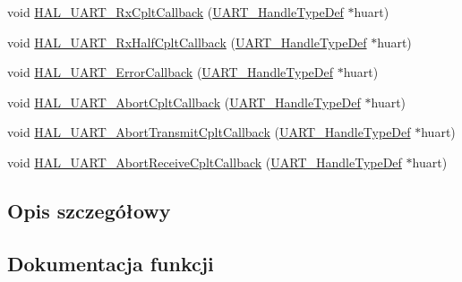\begin{DoxyCompactItemize}
\item 
void \hyperlink{group___u_a_r_t___exported___functions___group2_gae494a9643f29b87d6d81e5264e60e57b}{H\+A\+L\+\_\+\+U\+A\+R\+T\+\_\+\+Rx\+Cplt\+Callback} (\hyperlink{group___u_a_r_t___exported___types_ga7adf4f3e4c3ecde572be5925c915a967}{U\+A\+R\+T\+\_\+\+Handle\+Type\+Def} $\ast$huart)
\item 
void \hyperlink{group___u_a_r_t___exported___functions___group2_ga1884970cc493d8efba5aec28c0d526e7}{H\+A\+L\+\_\+\+U\+A\+R\+T\+\_\+\+Rx\+Half\+Cplt\+Callback} (\hyperlink{group___u_a_r_t___exported___types_ga7adf4f3e4c3ecde572be5925c915a967}{U\+A\+R\+T\+\_\+\+Handle\+Type\+Def} $\ast$huart)
\item 
void \hyperlink{group___u_a_r_t___exported___functions___group2_ga0e0456ea96d55db31de947fb3e954f18}{H\+A\+L\+\_\+\+U\+A\+R\+T\+\_\+\+Error\+Callback} (\hyperlink{group___u_a_r_t___exported___types_ga7adf4f3e4c3ecde572be5925c915a967}{U\+A\+R\+T\+\_\+\+Handle\+Type\+Def} $\ast$huart)
\item 
void \hyperlink{group___u_a_r_t___exported___functions___group2_gacdcb274a742093c45869f2cfbb0a8b09}{H\+A\+L\+\_\+\+U\+A\+R\+T\+\_\+\+Abort\+Cplt\+Callback} (\hyperlink{group___u_a_r_t___exported___types_ga7adf4f3e4c3ecde572be5925c915a967}{U\+A\+R\+T\+\_\+\+Handle\+Type\+Def} $\ast$huart)
\item 
void \hyperlink{group___u_a_r_t___exported___functions___group2_gacf94995fb9986930151f3c5586d37e5c}{H\+A\+L\+\_\+\+U\+A\+R\+T\+\_\+\+Abort\+Transmit\+Cplt\+Callback} (\hyperlink{group___u_a_r_t___exported___types_ga7adf4f3e4c3ecde572be5925c915a967}{U\+A\+R\+T\+\_\+\+Handle\+Type\+Def} $\ast$huart)
\item 
void \hyperlink{group___u_a_r_t___exported___functions___group2_ga0f9d15c5ae7b69f09e0ee5f2461e7e7a}{H\+A\+L\+\_\+\+U\+A\+R\+T\+\_\+\+Abort\+Receive\+Cplt\+Callback} (\hyperlink{group___u_a_r_t___exported___types_ga7adf4f3e4c3ecde572be5925c915a967}{U\+A\+R\+T\+\_\+\+Handle\+Type\+Def} $\ast$huart)
\end{DoxyCompactItemize}


\subsection{Opis szczegółowy}


\subsection{Dokumentacja funkcji}
\mbox{\label{group___u_a_r_t___exported___functions___group2_ga2d7be1f59fc810f49dadc580307a4862}} 
